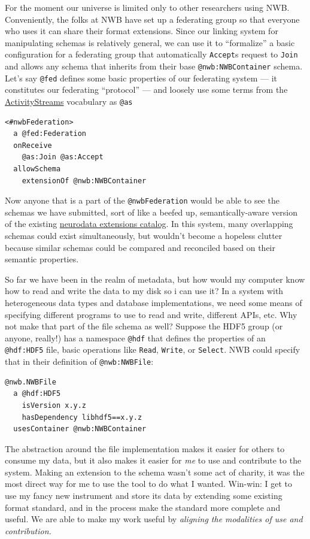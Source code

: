 \documentclass[notoc]{tufte-book}
\begin{document}
For the moment our universe is limited only to other researchers using
NWB. Conveniently, the folks at NWB have set up a federating group so
that everyone who uses it can share their format extensions. Since our
linking system for manipulating schemas is relatively general, we can
use it to ``formalize'' a basic configuration for a federating group
that automatically \texttt{Accept}s request to \texttt{Join} and allows
any schema that inherits from their base \texttt{@nwb:NWBContainer}
schema. Let's say \texttt{@fed} defines some basic properties of our
federating system --- it constitutes our federating ``protocol'' --- and
loosely use some terms from the
\href{https://www.w3.org/ns/activitystreams\#class-definitions}{ActivityStreams}
vocabulary as \texttt{@as}

\begin{verbatim}
<#nwbFederation>
  a @fed:Federation
  onReceive
    @as:Join @as:Accept
  allowSchema
    extensionOf @nwb:NWBContainer
\end{verbatim}

Now anyone that is a part of the \texttt{@nwbFederation} would be able
to see the schemas we have submitted, sort of like a beefed up,
semantically-aware version of the existing
\href{https://nwb-extensions.github.io/}{neurodata extensions catalog}.
In this system, many overlapping schemas could exist simultaneously, but
wouldn't become a hopeless clutter because similar schemas could be
compared and reconciled based on their semantic properties.

So far we have been in the realm of metadata, but how would my computer
know how to read and write the data to my disk so i can use it? In a
system with heterogeneous data types and database implementations, we
need some means of specifying different programs to use to read and
write, different APIs, etc. Why not make that part of the file schema as
well? Suppose the HDF5 group (or anyone, really!) has a namespace
\texttt{@hdf} that defines the properties of an \texttt{@hdf:HDF5} file,
basic operations like \texttt{Read}, \texttt{Write}, or \texttt{Select}.
NWB could specify that in their definition of \texttt{@nwb:NWBFile}:

\begin{verbatim}
@nwb.NWBFile
  a @hdf:HDF5
    isVersion x.y.z
    hasDependency libhdf5==x.y.z
  usesContainer @nwb:NWBContainer
\end{verbatim}

The abstraction around the file implementation makes it easier for
others to consume my data, but it also makes it easier for \emph{me} to
use and contribute to the system. Making an extension to the schema
wasn't some act of charity, it was the most direct way for me to use the
tool to do what I wanted. Win-win: I get to use my fancy new instrument
and store its data by extending some existing format standard, and in
the process make the standard more complete and useful. We are able to
make my work useful by \emph{aligning the modalities of use and
contribution.}
\end{document}
